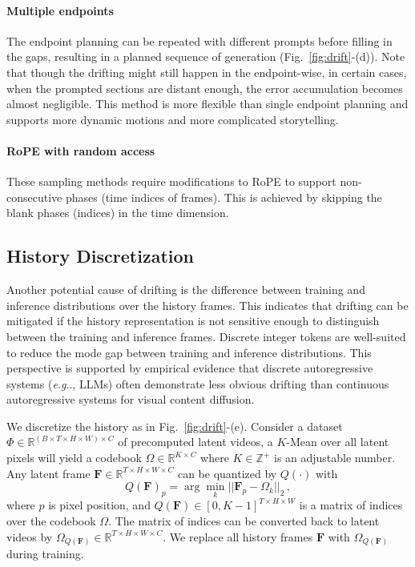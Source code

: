 \documentclass{article}
\makeatletter
\DeclareRobustCommand\onedot{\futurelet\@let@token\@onedot}
\def\@onedot{\ifx\@let@token.\else.\null\fi\xspace}
\def\eg{\emph{e.g}\onedot}
\makeatother
\begin{document}
\paragraph{Multiple endpoints} The endpoint planning can be repeated with different prompts before filling in the gaps, resulting in a planned sequence of generation (Fig.~\ref{fig:drift}-(d)). Note that though the drifting might still happen in the endpoint-wise, in certain cases, when the prompted sections are distant enough, the error accumulation becomes almost negligible. This method is more flexible than single endpoint planning and supports more dynamic motions and more complicated storytelling.

\paragraph{RoPE with random access} These sampling methods require modifications to RoPE to support non-consecutive phases (time indices of frames). This is achieved by skipping the blank phases (indices) in the time dimension.

\subsection{History Discretization}

Another potential cause of drifting is the difference between training and inference distributions over the history frames. This indicates that drifting can be mitigated if the history representation is not sensitive enough to distinguish between the training and inference frames. Discrete integer tokens are well-suited to reduce the mode gap between training and inference distributions. This perspective is supported by empirical evidence that discrete autoregressive systems (\eg, LLMs) often demonstrate less obvious drifting than continuous autoregressive systems for visual content diffusion.

We discretize the history as in Fig.~\ref{fig:drift}-(e). Consider a dataset $\Phi\in\mathbb{R}^{(B\times T \times H\times W)\times C}$ of precomputed latent videos, a $K$-Mean over all latent pixels will yield a codebook $\Omega\in\mathbb{R}^{K\times C}$ where $K\in\mathbb{Z}^{+}$ is an adjustable number. Any latent frame $\bm{F}\in\mathbb{R}^{T\times H\times W\times C}$ can be quantized by $Q(\cdot)$ with
\begin{equation}
Q(\bm{F})_p=\arg \min_k || \bm{F}_p - \Omega_k ||_2\,,
\end{equation}
where $p$ is pixel position, and $Q(\bm{F})\in[0, K-1]^{T \times H\times W}$ is a matrix of indices over the codebook $\Omega$. The matrix of indices can be converted back to latent videos by $\Omega_{Q(\bm{F})}\in\mathbb{R}^{T\times H\times W\times C}$. We replace all history frames $\bm{F}$ with $\Omega_{Q(\bm{F})}$ during training.
\end{document}
